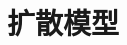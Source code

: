 \setcounter{chapter}{25}

\hypertarget{ux6269ux6563ux6a21ux578b}{%
\chapter{扩散模型}\label{ux6269ux6563ux6a21ux578b}}
